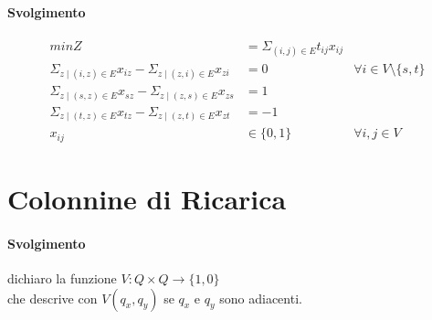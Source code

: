 \paragraph{Svolgimento}

\begin{align*}
    min Z &= \Sigma _{(i,j) \in E} t_{ij} x_{ij} \\
    \Sigma _{z \mid (i,z) \in E} x_{iz} - \Sigma _{z \mid (z,i) \in E} x_{zi} &= 0 &\forall i \in V \setminus \{s,t\} \\
    \Sigma _{z \mid (s,z) \in E} x_{sz} - \Sigma _{z \mid (z,s) \in E} x_{zs} &= 1 \\
    \Sigma _{z \mid (t,z) \in E} x_{tz} - \Sigma _{z \mid (z,t) \in E} x_{zt} &= -1 \\
    x_{ij} &\in \{0,1\} &\forall i,j \in V
\end{align*}

\section{Colonnine di Ricarica}

\paragraph{Svolgimento}

dichiaro la funzione $V : Q \times Q \rightarrow \{1,0\}$ \\
che descrive con $V(q_x, q_y)$ se $q_x$ e $q_y$ sono adiacenti.

